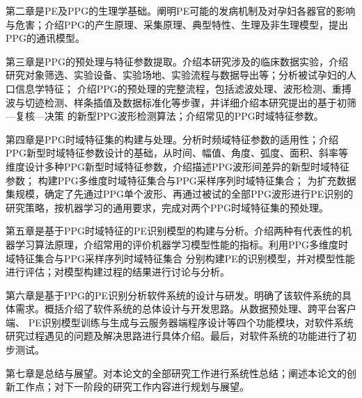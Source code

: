 第二章是PE及PPG的生理学基础。阐明PE可能的发病机制及对孕妇各器官的影响与危害；介绍PPG的产生原理、采集原理、典型特性、生理及非生理模型，提出PPG的通讯模型。

第三章是PPG的预处理与特征参数提取。介绍本研究涉及的临床数据实验，介绍研究对象筛选、实验设备、实验场地、实验流程与数据导出等；分析被试孕妇的人口信息学特征；
介绍PPG的预处理的完整流程，包括滤波处理、波形检测、重搏波与切迹检测、样条插值及数据标准化等步骤，并详细介绍本研究提出的基于初筛—复核—决策
的新型PPG波形检测算法；介绍常见的PPG时域特征参数。

第四章是PPG时域特征集的构建与处理。分析时频域特征参数的适用性；介绍PPG新型时域特征参数设计的基础，从时间、幅值、角度、弧度、面积、斜率等维度设计多种PPG新型时域特征参数，介绍描述PPG波形间差异的新型时域特征参数；
构建PPG多维度时域特征集合与PPG采样序列时域特征集合；
为扩充数据集规模，确定了先通过PPG单个波形、再通过被试的全部PPG波形进行PE识别的研究策略，按机器学习的通用要求，完成对两个PPG时域特征集的预处理。

第五章是基于PPG时域特征的PE识别模型的构建与分析。介绍两种有代表性的机器学习算法原理，介绍常用的评价机器学习模型性能的指标。利用PPG多维度时域特征集合与PPG采样序列时域特征集合
分别构建PE的识别模型，并对模型性能进行评估；对模型构建过程的结果进行讨论与分析。

第六章是基于PPG的PE识别分析软件系统的设计与研发。明确了该软件系统的具体需求。概括介绍了软件系统的总体设计与开发思路。从数据预处理、跨平台客户端、
PE识别模型训练与生成与云服务器端程序设计等四个功能模块，对软件系统研究过程遇见的问题及解决思路进行具体介绍。最后，对软件系统的功能进行了初步测试。

第七章是总结与展望。对本论文的全部研究工作进行系统性总结；阐述本论文的创新工作点；对下一阶段的研究工作内容进行规划与展望。